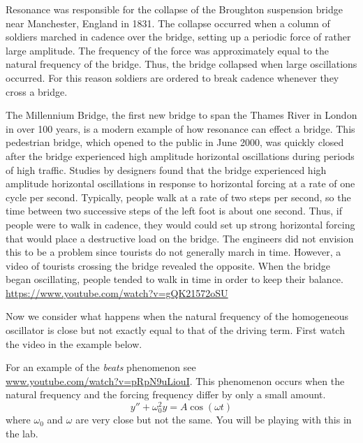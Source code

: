 \begin{example}
    Resonance was responsible for the collapse of the Broughton suspension bridge near
    Manchester, England in 1831. The collapse occurred when a column of soldiers marched
    in cadence over the bridge, setting up a periodic force of rather large amplitude. The
    frequency of the force was approximately equal to the natural frequency of the bridge.
    Thus, the bridge collapsed when large oscillations occurred. For this reason soldiers
    are ordered to break cadence whenever they cross a bridge.

    The Millennium Bridge, the first new bridge to span the Thames River in London in over
    100 years, is a modern example of how resonance can effect a bridge.
    This pedestrian bridge, which opened to the public in June 2000, was quickly closed
    after the bridge experienced high amplitude horizontal oscillations during periods of
    high traffic. Studies by designers found that the bridge experienced high amplitude
    horizontal oscillations in response to horizontal forcing at a rate of one cycle per
    second. Typically, people walk at a rate of two steps per second, so the time between
    two successive steps of the left foot is about one second. Thus, if people were to
    walk in cadence, they would could set up strong horizontal forcing that would place a
    destructive load on the bridge. The engineers did not envision this to be a problem
    since tourists do not generally march in time. However, a video of tourists crossing
    the bridge revealed the opposite. When the bridge began oscillating, people tended to
    walk in time in order to keep their balance.\\
    \href{https://www.youtube.com/watch?v=gQK21572oSU}{https://www.youtube.com/watch?v=gQK21572oSU}
\end{example}

Now we consider what happens when the natural frequency of the homogeneous oscillator is
close but not exactly equal to that of the driving term.  First watch the video in the
example below.
\begin{example}
    For an example of the {\it beats} phenomenon see \\
    \href{https://www.youtube.com/watch?v=pRpN9uLiouI}{www.youtube.com/watch?v=pRpN9uLiouI}.
    This phenomenon occurs when the natural frequency and the forcing frequency differ by
    only a small amount.  
    \[ y'' + \omega_0^2 y = A \cos(\omega t) \]
    where $\omega_0$ and $\omega$ are very close but not the same.
    You will be playing with this in the lab.
\end{example}

